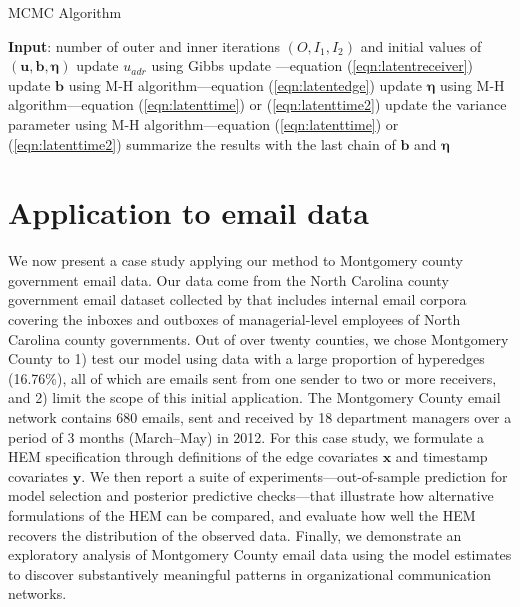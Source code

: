 \documentclass[ba]{imsart}
\def\spacingset#1{\renewcommand{\baselinestretch}%
	{#1}\small\normalsize} \spacingset{1}
\numberwithin{equation}{section}
\theoremstyle{plain}
\begin{document}
	\begin{algorithm}[!t]
		\spacingset{1}
		\SetAlgoLined
		\caption{MCMC Algorithm}
		\begin{algorithmic}
			\STATE \textbf{Input}: number of outer and inner iterations $(O, I_1, I_2)$ and initial values of $(\boldsymbol{u}, \boldsymbol{b}, \boldsymbol{\eta})$
			\vskip 0.1in
			\STATE update $u_{adr}$ using Gibbs update ---equation (\ref{eqn:latentreceiver})
			\ENDFOR
			\ENDFOR
			\ENDFOR
			\STATE update $\boldsymbol{b}$ using M-H algorithm---equation (\ref{eqn:latentedge})
			\ENDFOR
			\STATE update $\boldsymbol{\eta}$ using M-H algorithm---equation (\ref{eqn:latenttime}) or (\ref{eqn:latenttime2}) 
			\ENDFOR
			\STATE update the variance parameter using M-H algorithm---equation (\ref{eqn:latenttime}) or (\ref{eqn:latenttime2}) 
			\ENDIF
			\ENDFOR
			\STATE	summarize the results with the last chain of $\boldsymbol{b}$ and $\boldsymbol{\eta}$
		\end{algorithmic}
		\label{alg:MCMC}
	\end{algorithm}
\iffalse
	\section{Application to email data}\label{sec:Emails}
	We now present a case study applying our method to Montgomery county government email data.
	Our data come from the North Carolina county government email dataset collected by \cite{ben2017transparency} that includes internal email corpora covering the inboxes and outboxes of managerial-level employees of North Carolina county governments. Out of over twenty counties, we chose Montgomery County to 1) test our model using data with a large proportion of hyperedges (16.76\%), all of which are emails sent from one sender to two or more receivers, and 2) limit the scope of this initial application. The Montgomery County email network contains 680 emails, sent and received by 18 department managers over a period of 3 months (March--May) in 2012. For this case study,
	we formulate a HEM specification through definitions of the edge covariates $\boldsymbol{x}$ and timestamp covariates $\boldsymbol{y}$. We then report a suite of experiments---out-of-sample prediction for model selection and posterior predictive checks---that illustrate how alternative formulations of the HEM can be compared, and evaluate how well the HEM recovers the distribution of the observed data. Finally, we demonstrate an exploratory analysis of Montgomery County email data using the model estimates to discover substantively meaningful patterns in organizational communication networks.
\end{document}
